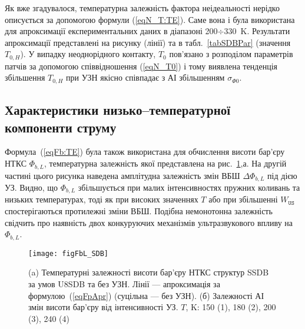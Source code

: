 Як вже згадувалося, температурна залежність фактора неідеальності нерідко описується за допомогою формули (\ref{eqN_T:TE}).
Саме вона і була використана для апроксимації експериментальних даних в діапазоні 200$\div$330~K.
Результати апроксимації представлені на рисунку (лінії) та в табл.~\ref{tabSDBPar} (значення $T_{0,H}$).
У випадку неоднорідного контакту, $T_0$ пов'язано з розподілом параметрів патчів
за допомогою співвідношення (\ref{eqN_T0}) і тому виявлена тенденція
збільшення $T_{0,H}$ при УЗН якісно співпадає з АІ збільшенням $\sigma_{\Phi0}$.





\subsection{Характеристики низько--температурної компоненти струму}

Формула~(\ref{eqFb:TE}) була також використана для обчислення висоти бар'єру НТКС $\Phi_{b,L}$, температурна залежність
якої представлена на рис.~\ref{figFbL_SDB},а.
На другій частині цього рисунка наведена амплітудна залежність змін ВБШ $\Delta \Phi_{b,L}$ під дією УЗ.
Видно, що $\Phi_{b,L}$ збільшується при малих інтенсивностях пружних коливань та низьких температурах,
тоді як при високих значеннях $T$ або при збільшенні $W_\mathtt{US}$ спостерігаються протилежні зміни ВБШ.
Подібна немонотонна залежність свідчить про наявність двох конкуруючих механізмів ультразвукового впливу на $\Phi_{b,L}$.


\begin{figure}
\center
\texttt{[image: figFbL\_SDB]}
\caption{\label{figFbL_SDB}
(a) Температурні залежності висоти бар'єру НТКС структур SSDB за умов U8SDB та без УЗН.
Лінії --- апроксимація за формулою~(\ref{eqFpApr}) (суцільна --- без УЗН).
(б) Залежності АІ змін висоти бар'єру від інтенсивності УЗ.
$T$, K: 150 (1), 180 (2), 200 (3), 240 (4)
}%
\end{figure}

